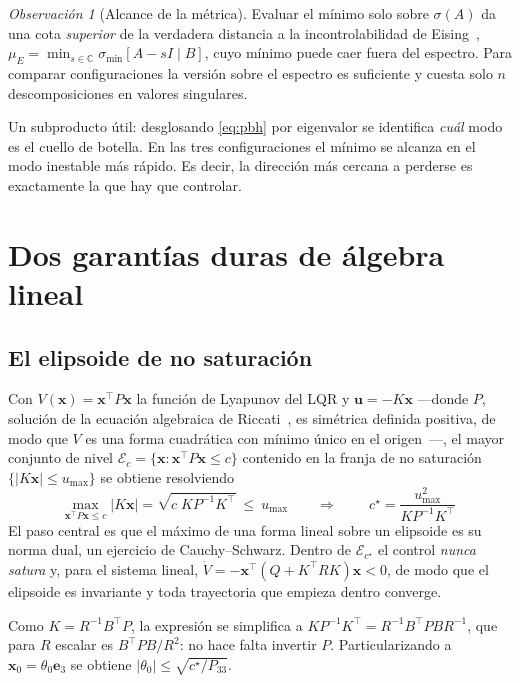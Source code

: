 \documentclass[11pt,letterpaper]{article}
\theoremstyle{definition}
\theoremstyle{plain}
\theoremstyle{remark}
\newtheorem{observacion}[definicion]{Observación}
\newcommand{\spec}{\sigma}
\newcommand{\C}{\mathbb{C}}
\newcommand{\calE}{\mathcal{E}}
\newcommand{\xv}{\bm{x}}
\newcommand{\uv}{\bm{u}}
\begin{document}
\begin{observacion}[Alcance de la métrica]
Evaluar el mínimo solo sobre $\spec(A)$ da una cota \emph{superior} de la
verdadera distancia a la incontrolabilidad de Eising~\cite{eising1984},
$\mu_E=\min_{s\in\C}\sigma_{\min}[A-sI\mid B]$, cuyo mínimo puede caer fuera del
espectro. Para comparar configuraciones la versión sobre el espectro es
suficiente y cuesta solo $n$ descomposiciones en valores singulares.
\end{observacion}

Un subproducto útil: desglosando \cref{eq:pbh} por eigenvalor se identifica
\emph{cuál} modo es el cuello de botella. En las tres configuraciones el mínimo
se alcanza en el modo inestable más rápido. Es decir, la dirección más cercana a
perderse es exactamente la que hay que controlar.

\section{Dos garantías duras de álgebra lineal}

\subsection{El elipsoide de no saturación}
\label{sec:elipsoide}

Con $V(\xv)=\xv^\top P\xv$ la función de Lyapunov del LQR y $\uv=-K\xv$ ---donde
$P$, solución de la ecuación algebraica de Riccati~\cite{ogata2010}, es simétrica
definida positiva, de modo que $V$ es una forma cuadrática con mínimo único en el
origen~\cite{olver2018}---, el mayor conjunto de nivel
$\calE_c=\{\xv:\xv^\top P\xv\le c\}$ contenido en la franja de no saturación
$\{|K\xv|\le u_{\max}\}$ se obtiene resolviendo
\[
\max_{\xv^\top P\xv\le c}|K\xv|=\sqrt{c\;KP^{-1}K^\top}\ \le\ u_{\max}
\qquad\Longrightarrow\qquad
\boxed{\ c^\star=\frac{u_{\max}^2}{KP^{-1}K^\top}\ }
\]
El paso central es que el máximo de una forma lineal sobre un elipsoide es su
norma dual, un ejercicio de Cauchy--Schwarz. Dentro de $\calE_{c^\star}$ el
control \emph{nunca satura} y, para el sistema lineal,
$\dot V=-\xv^\top(Q+K^\top RK)\xv<0$, de modo que el elipsoide es invariante y
toda trayectoria que empieza dentro converge.

Como $K=R^{-1}B^\top P$, la expresión se simplifica a
$KP^{-1}K^\top=R^{-1}B^\top PBR^{-1}$, que para $R$ escalar es $B^\top PB/R^2$:
no hace falta invertir $P$. Particularizando a $\xv_0=\theta_0\bm{e}_3$ se
obtiene $|\theta_0|\le\sqrt{c^\star/P_{33}}$.
\end{document}
